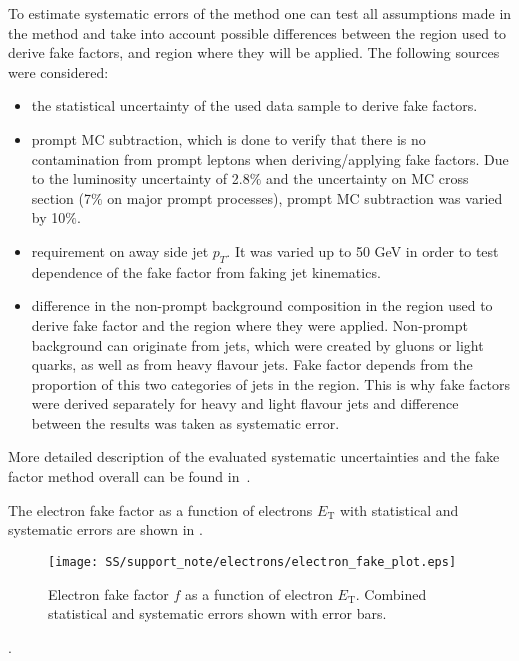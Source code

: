 To estimate systematic errors of the method one can test all assumptions made in the method and take into account possible differences between the region used to derive 
fake factors, and region where they will be applied. The following sources were considered:
\begin{itemize}
 \item the statistical uncertainty of the used data sample to derive fake factors.
 \item prompt MC subtraction, which is done to verify that there is no contamination from prompt leptons when deriving/applying fake factors.
 Due to the luminosity uncertainty of 2.8$\%$ and the uncertainty on MC cross section (7$\%$ on major prompt processes), prompt MC subtraction
 was varied by 10$\%$.
 \item requirement on away side jet $p_T$. It was varied up to 50 GeV in order to test dependence of the fake factor from faking jet kinematics.
 \item difference in the non-prompt background composition in the region used to derive fake factor and the region where they were applied.
 Non-prompt background can originate from jets, which were created by gluons or light quarks, as well as from heavy flavour jets.
 Fake factor depends from the proportion of this two categories of jets in the region. This is why fake factors were derived separately
 for heavy and light flavour jets and difference between the results was taken as systematic error.
\end{itemize}
More detailed description of the evaluated systematic uncertainties and the fake factor method overall can be found in~\cite{anthony_thesis}.

The electron fake factor as a function of electrons $E_\mathrm{T}$ with statistical and systematic errors are
shown in .
\begin{figure}[h]
\begin{center}
\texttt{[image: SS/support\_note/electrons/electron\_fake\_plot.eps]}
\caption{Electron fake factor $f$ as a function of electron $E_\mathrm{T}$. Combined statistical and systematic errors shown with error bars.}
\label{fig:ff_e_errs}
\end{center}
\end{figure} 
.


